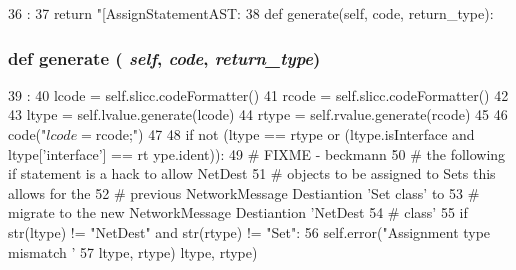\begin{DoxyCode}
36                       :
37         return "[AssignStatementAST: %
38 
    def generate(self, code, return_type):
\end{DoxyCode}
\hypertarget{classslicc_1_1ast_1_1AssignStatementAST_1_1AssignStatementAST_a4555d1cee0dccf3942ea35fe86de2e8e}{
\subsubsection[{generate}]{\setlength{\rightskip}{0pt plus 5cm}def generate ( {\em self}, \/   {\em code}, \/   {\em return\_\-type})}}
\label{classslicc_1_1ast_1_1AssignStatementAST_1_1AssignStatementAST_a4555d1cee0dccf3942ea35fe86de2e8e}



\begin{DoxyCode}
39                                          :
40         lcode = self.slicc.codeFormatter()
41         rcode = self.slicc.codeFormatter()
42 
43         ltype = self.lvalue.generate(lcode)
44         rtype = self.rvalue.generate(rcode)
45 
46         code("$lcode = $rcode;")
47 
48         if not (ltype == rtype or (ltype.isInterface and ltype['interface'] == rt
      ype.ident)):
49             # FIXME - beckmann
50             # the following if statement is a hack to allow NetDest
51             # objects to be assigned to Sets this allows for the
52             # previous NetworkMessage Destiantion 'Set class' to
53             # migrate to the new NetworkMessage Destiantion 'NetDest
54             # class'
55             if str(ltype) != "NetDest" and str(rtype) != "Set":
56                 self.error("Assignment type mismatch '%
57                            ltype, rtype)
                           ltype, rtype)
\end{DoxyCode}


